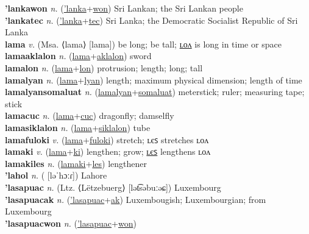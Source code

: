 \textbf{'lankawon} \textit{n.} (\hyperref['lanka]{'lanka}+\hyperref[won]{won})
Sri Lankan; the Sri Lankan people \label{'lankawon} \\
\textbf{'lankatec} \textit{n.} (\hyperref['lanka]{'lanka}+\hyperref[tec]{tec})
Sri Lanka; the Democratic Socialist Republic of Sri Lanka \label{'lankatec} \\
\textbf{lama} \textit{v.} (Msa. ⟨lama⟩ [lama])
be long; be tall; \hyperref[lamalon]{ʟᴏᴧ} is long in time or space \label{lama} \\
\textbf{lamaaklalon} \textit{n.} (\hyperref[lama]{lama}+\hyperref[aklalon]{aklalon})
sword \label{lamaaklalon} \\
\textbf{lamalon} \textit{n.} (\hyperref[lama]{lama}+\hyperref[lon]{lon})
protrusion; length; long; tall \label{lamalon} \\
\textbf{lamalyan} \textit{n.} (\hyperref[lama]{lama}+\hyperref[lyan]{lyan})
length; maximum physical dimension; length of time \label{lamalyan} \\
\textbf{lamalyansomaluat} \textit{n.} (\hyperref[lamalyan]{lamalyan}+\hyperref[somaluat]{somaluat})
meterstick; ruler; measuring tape; stick \label{lamalyansomaluat} \\
\textbf{lamacuc} \textit{n.} (\hyperref[lama]{lama}+\hyperref[cuc]{cuc})
dragonfly; damselfly \label{lamacuc} \\
\textbf{lamasiklalon} \textit{n.} (\hyperref[lama]{lama}+\hyperref[siklalon]{siklalon})
tube \label{lamasiklalon} \\
\textbf{lamafuloki} \textit{v.} (\hyperref[lama]{lama}+\hyperref[fuloki]{fuloki})
stretch; ʟєꜱ stretches ʟᴏᴧ \label{lamafuloki} \\
\textbf{lamaki} \textit{v.} (\hyperref[lama]{lama}+\hyperref[ki]{ki})
lengthen; grow; \hyperref[lamakiles]{ʟєꜱ} lengthens ʟᴏᴧ \label{lamaki} \\
\textbf{lamakiles} \textit{n.} (\hyperref[lamaki]{lamaki}+\hyperref[les]{les})
lengthener \label{lamakiles} \\
\textbf{'lahol} \textit{n.} ( [ləˈhɔːɾ])
Lahore \label{'lahol} \\
\textbf{'lasapuac} \textit{n.} (Ltz. ⟨Lëtzebuerg⟩ [lət͡səbuːəɕ])
Luxembourg \label{'lasapuac} \\
\textbf{'lasapuacak} \textit{n.} (\hyperref['lasapuac]{'lasapuac}+\hyperref[ak]{ak})
Luxembougish; Luxembourgian; from Luxembourg \label{'lasapuacak} \\
\textbf{'lasapuacwon} \textit{n.} (\hyperref['lasapuac]{'lasapuac}+\hyperref[won]{won})
